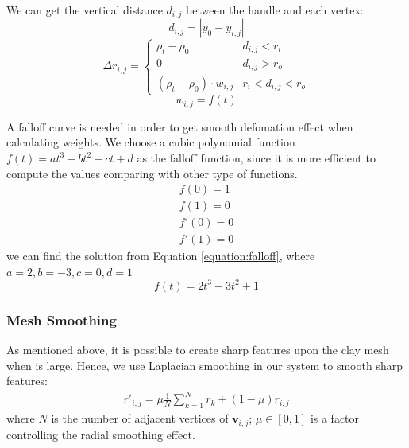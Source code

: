 We can get the vertical distance $d_{i,j}$ between the handle and each vertex:
\begin{equation}
d_{i,j} = |y_{0} - y_{i,j}|
\end{equation}
\begin{equation}
\Delta r_{i,j} = \begin{cases}
\rho_{t} - \rho_{0} &  d_{i,j} < r_{i} \\
0 &  d_{i,j} > r_{o} \\
(\rho_{t} - \rho_{0}) \cdot w_{i,j} &  r_{i} < d_{i,j} < r_{o}
\end{cases}
\end{equation}
\begin{equation}
w_{i,j} = f(t)
\end{equation}

A falloff curve is needed in order to get smooth defomation effect when calculating weights. We choose a cubic polynomial function $f(t) = at^3 + bt^2 + ct + d$ as the falloff function, since it is more efficient to compute the values comparing with other type of functions.
\begin{equation}
\begin{aligned}
\label{equation:falloff}
f(0) = 1 \\
f(1) = 0 \\ 
f'(0) = 0 \\
f'(1) = 0
\end{aligned}
\end{equation}
we can find the solution from Equation \ref{equation:falloff}, where 
$a = 2, b = -3, c = 0, d = 1$
\begin{equation}
f(t) = 2t^3 - 3t^2 + 1
\end{equation}


\subsubsection{Mesh Smoothing}
\label{sec:4.2.4}
As mentioned above, it is possible to create sharp features upon the clay mesh when  is large. Hence, we use Laplacian smoothing in our system to smooth sharp features: 
\begin{equation}
\begin{split}
r'_{i,j} = 
\mu  \frac{1}{N} 
\sum_{k=1}^N r_{k}
+ (1 - \mu)  r_{i,j}
\end{split}
\end{equation}
where $N$ is the number of adjacent vertices of $\mathbf{v}_{i,j}$; $\mu \in [0,1]$ is a factor controlling the radial smoothing effect.

